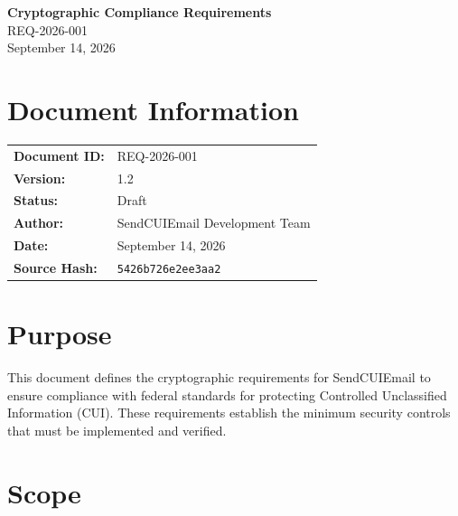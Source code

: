 \documentclass[11pt,letterpaper]{article}
\newcommand{\UniqueID}{REQ-2026-001}
\newcommand{\DocumentDate}{September 14, 2026}
\newcommand{\AuthorName}{SendCUIEmail Development Team}
\newcommand{\DocumentTitle}{Cryptographic Compliance Requirements}
\begin{document}
\begin{center}
\Large\textbf{\DocumentTitle}\\[6pt]
\large\UniqueID\\[12pt]
\normalsize\DocumentDate
\end{center}

\vspace{0.25in}

\section*{Document Information}

\begin{tabular}{@{}ll@{}}
\textbf{Document ID:} & \UniqueID \\
\textbf{Version:} & 1.2 \\
\textbf{Status:} & Draft \\
\textbf{Author:} & \AuthorName \\
\textbf{Date:} & \DocumentDate \\
\textbf{Source Hash:} & \texttt{5426b726e2ee3aa2} \\
\end{tabular}

\vspace{0.25in}

\section{Purpose}

This document defines the cryptographic requirements for SendCUIEmail to ensure compliance with federal standards for protecting Controlled Unclassified Information (CUI). These requirements establish the minimum security controls that must be implemented and verified.

\section{Scope}
\end{document}
